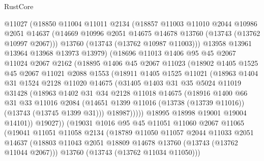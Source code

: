 \begin{lexlean}{RustCore}
\begin{coremodule}
          @11027
          (@18850
            @11004
            @11011
            @2134
            (@18857
              @11003
              @11010
              @2044
              @10986
              @2051
              @14637
              (@14669 @10996 @2051 @14675 @14678 @13760 (@13743 (@13762 @10997 @2067)))
              @13760
              (@13743 (@13762 @10987 @11003)))
            @13958
            @13961
            @13964
            @13968
            @13973
            @13979)
          (@18696
            @11013
            @1406
            @95
            @45
            @2067
            @11024
            @2067
            @2162
            (@18895
              @1406
              @45
              @2067
              @11023
              (@18902
                @1405
                @1525
                @45
                @2067
                @11021
                @2088
                @1553
                (@18911
                  @1405
                  @1525
                  @11021
                  (@18963
                    @1404
                    @31
                    @1524
                    @2128
                    @11020
                    @14675
                    (@31405
                      @1403
                      @31
                      @35
                      @5024
                      @11019
                      @31428
                      (@18963
                        @1402
                        @31
                        @34
                        @2128
                        @11018
                        @14675
                        (@18916
                          @1400
                          @66
                          @31
                          @33
                          @11016
                          @2084
                          (@14651 @1399 @11016 (@13738 (@13739 @11016)) (@13743 (@13745 @1399 @31)))
                          @18987)))))
                @18995
                @18998
                @19001
                @19004
                @14101))
            @19027))
        (@19031
          @1016
          @95
          @45
          @11051
          @11060
          @2067
          @11065
          (@19041
            @11051
            @11058
            @2134
            (@18789
              @11050
              @11057
              @2044
              @11033
              @2051
              @14637
              (@18803 @11043 @2051 @18809 @14678 @13760 (@13743 (@13762 @11044 @2067)))
              @13760
              (@13743 (@13762 @11034 @11050)))

\end{coremodule}
\end{lexlean}
